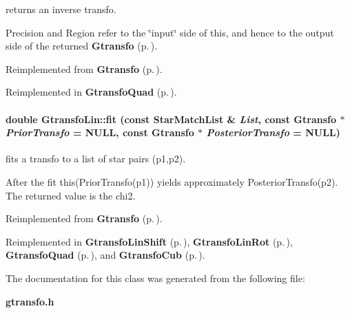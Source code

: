 returns an inverse transfo.

Precision and Region refer to the \char`\"{}input\char`\"{} side of this,  and hence to the output side of the returned {\bf Gtransfo} {\rm (p.\,\pageref{class_gtransfo})}. 

Reimplemented from {\bf Gtransfo} {\rm (p.\,\pageref{class_gtransfo_a12})}.

Reimplemented in {\bf Gtransfo\-Quad} {\rm (p.\,\pageref{class_gtransfoquad_a8})}.
\paragraph{\setlength{\rightskip}{0pt plus 5cm}double Gtransfo\-Lin::fit (const Star\-Match\-List \& {\em List}, const {\bf Gtransfo} $\ast$ {\em Prior\-Transfo} = NULL, const {\bf Gtransfo} $\ast$ {\em Posterior\-Transfo} = NULL)\hspace{0.3cm}{\tt  [virtual]}}\hfill\label{class_gtransfolin_a9}


fits a transfo to a list of star pairs (p1,p2).

After the fit this(Prior\-Transfo(p1)) yields approximately Posterior\-Transfo(p2). The returned value is the chi2. 

Reimplemented from {\bf Gtransfo} {\rm (p.\,\pageref{class_gtransfo_a4})}.

Reimplemented in {\bf Gtransfo\-Lin\-Shift} {\rm (p.\,\pageref{class_gtransfolinshift_a2})}, {\bf Gtransfo\-Lin\-Rot} {\rm (p.\,\pageref{class_gtransfolinrot_a2})}, {\bf Gtransfo\-Quad} {\rm (p.\,\pageref{class_gtransfoquad_a5})}, and {\bf Gtransfo\-Cub} {\rm (p.\,\pageref{class_gtransfocub_a6})}.

The documentation for this class was generated from the following file:\begin{CompactItemize}
\item 
{\bf gtransfo.h}\end{CompactItemize}
